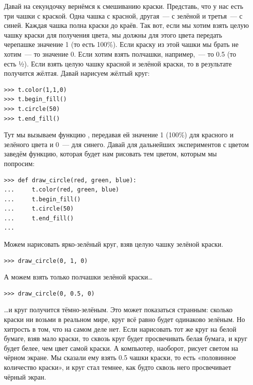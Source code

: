 Давай на секундочку вернёмся к смешиванию краски. Представь, что у нас есть три чашки с краской. Одна чашка с красной, другая — с зелёной и третья — с синей. Каждая чашка полна краски до краёв. Так вот, если мы хотим взять целую чашку краски для получения цвета, мы должны для этого цвета передать черепашке значение 1 (то есть 100\%). Если краску из этой чашки мы брать не хотим — то значение 0. Если хотим взять полчашки, например, — то 0.5 (то есть ½). Если взять целую чашку красной и зелёной краски, то в результате получится жёлтая. Давай нарисуем жёлтый круг:

\begin{listing}
\begin{verbatim}
>>> t.color(1,1,0)
>>> t.begin_fill()
>>> t.circle(50)
>>> t.end_fill()
\end{verbatim}
\end{listing}

Тут мы вызываем функцию , передавая ей значение 1 (100\%) для красного и зелёного цвета и 0 — для синего. Давай для дальнейших экспериментов с цветом заведём функцию, которая будет нам рисовать тем цветом, которым мы попросим:

\begin{listing}
\begin{verbatim}
>>> def draw_circle(red, green, blue):
...     t.color(red, green, blue)
...     t.begin_fill()
...     t.circle(50)
...     t.end_fill()
...
\end{verbatim}
\end{listing}

Можем нарисовать ярко-зелёный круг, взяв целую чашку зелёной краски.

\begin{listing}
\begin{verbatim}
>>> draw_circle(0, 1, 0)
\end{verbatim}
\end{listing}

А можем взять только полчашки зелёной краски…

\begin{listing}
\begin{verbatim}
>>> draw_circle(0, 0.5, 0)
\end{verbatim}
\end{listing}

…и круг получится тёмно-зелёным. Это может показаться странным: сколько краски ни возьми в реальном мире, круг всё равно будет одинаково зелёным. Но хитрость в том, что на самом деле нет. Если нарисовать тот же круг на белой бумаге, взяв мало краски, то сквозь круг будет просвечивать белая бумага, и круг будет белее, чем цвет самой краски. А компьютер, наоборот, рисует светом на чёрном экране. Мы сказали ему взять 0.5 чашки краски, то есть «половинное количество краски», и круг стал темнее, как будто сквозь него просвечивает чёрный экран.

